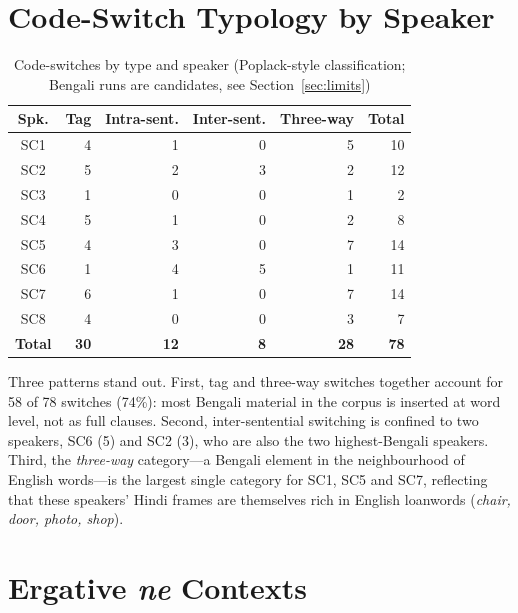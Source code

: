 \documentclass[11pt,a4paper]{report}
\begin{document}
\section{Code-Switch Typology by Speaker}

\begin{table}[H]
\centering
\caption{Code-switches by type and speaker (Poplack-style classification; Bengali runs are candidates, see Section~\ref{sec:limits})}
\label{tab:cs}
\begin{tabular}{crrrrr}
\toprule
\textbf{Spk.} & \textbf{Tag} & \textbf{Intra-sent.} & \textbf{Inter-sent.} & \textbf{Three-way} & \textbf{Total} \\
\midrule
SC1 & 4 & 1 & 0 & 5 & 10 \\
SC2 & 5 & 2 & 3 & 2 & 12 \\
SC3 & 1 & 0 & 0 & 1 &  2 \\
SC4 & 5 & 1 & 0 & 2 &  8 \\
SC5 & 4 & 3 & 0 & 7 & 14 \\
SC6 & 1 & 4 & 5 & 1 & 11 \\
SC7 & 6 & 1 & 0 & 7 & 14 \\
SC8 & 4 & 0 & 0 & 3 &  7 \\
\midrule
\textbf{Total} & \textbf{30} & \textbf{12} & \textbf{8} & \textbf{28} & \textbf{78} \\
\bottomrule
\end{tabular}
\end{table}


Three patterns stand out. First, tag and three-way switches together account for 58 of 78 switches (74\%): most Bengali material in the corpus is inserted at word level, not as full clauses. Second, inter-sentential switching is confined to two speakers, SC6 (5) and SC2 (3), who are also the two highest-Bengali speakers. Third, the \emph{three-way} category---a Bengali element in the neighbourhood of English words---is the largest single category for SC1, SC5 and SC7, reflecting that these speakers' Hindi frames are themselves rich in English loanwords (\textit{chair, door, photo, shop}).

\section{Ergative \textit{ne} Contexts}
\end{document}
